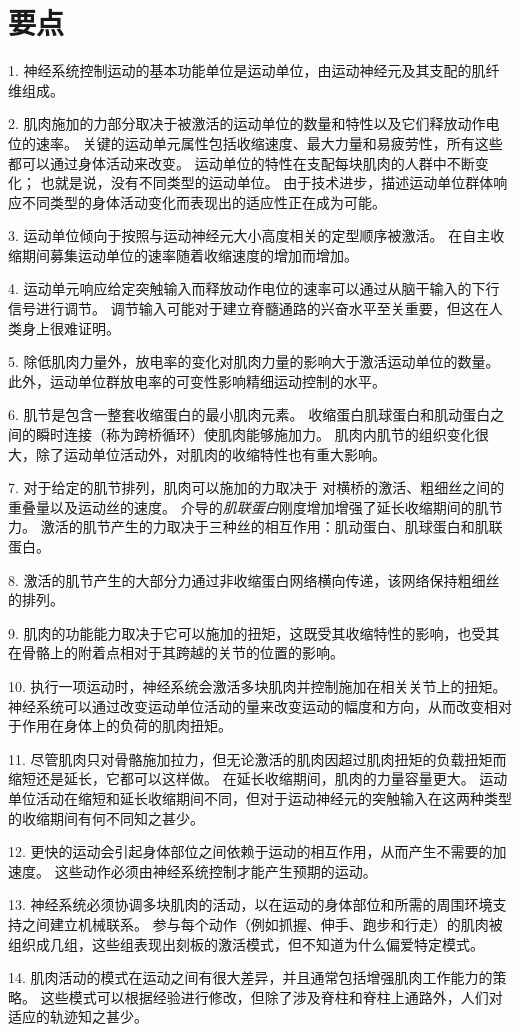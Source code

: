 \section{要点}

1. 神经系统控制运动的基本功能单位是运动单位，由运动神经元及其支配的肌纤维组成。 


2. 肌肉施加的力部分取决于被激活的运动单位的数量和特性以及它们释放动作电位的速率。
关键的运动单元属性包括收缩速度、最大力量和易疲劳性，所有这些都可以通过身体活动来改变。
运动单位的特性在支配每块肌肉的人群中不断变化；
也就是说，没有不同类型的运动单位。
由于技术进步，描述运动单位群体响应不同类型的身体活动变化而表现出的适应性正在成为可能。


3. 运动单位倾向于按照与运动神经元大小高度相关的定型顺序被激活。
在自主收缩期间募集运动单位的速率随着收缩速度的增加而增加。


4. 运动单元响应给定突触输入而释放动作电位的速率可以通过从脑干输入的下行信号进行调节。
调节输入可能对于建立脊髓通路的兴奋水平至关重要，但这在人类身上很难证明。


5. 除低肌肉力量外，放电率的变化对肌肉力量的影响大于激活运动单位的数量。
此外，运动单位群放电率的可变性影响精细运动控制的水平。


6. 肌节是包含一整套收缩蛋白的最小肌肉元素。
收缩蛋白肌球蛋白和肌动蛋白之间的瞬时连接（称为跨桥循环）使肌肉能够施加力。
肌肉内肌节的组织变化很大，除了运动单位活动外，对肌肉的收缩特性也有重大影响。


7. 对于给定的肌节排列，肌肉可以施加的力取决于  对横桥的激活、粗细丝之间的重叠量以及运动丝的速度。
 介导的\textit{肌联蛋白}刚度增加增强了延长收缩期间的肌节力。
激活的肌节产生的力取决于三种丝的相互作用：肌动蛋白、肌球蛋白和肌联蛋白。


8. 激活的肌节产生的大部分力通过非收缩蛋白网络横向传递，该网络保持粗细丝的排列。


9. 肌肉的功能能力取决于它可以施加的扭矩，这既受其收缩特性的影响，也受其在骨骼上的附着点相对于其跨越的关节的位置的影响。


10. 执行一项运动时，神经系统会激活多块肌肉并控制施加在相关关节上的扭矩。
神经系统可以通过改变运动单位活动的量来改变运动的幅度和方向，从而改变相对于作用在身体上的负荷的肌肉扭矩。


11. 尽管肌肉只对骨骼施加拉力，但无论激活的肌肉因超过肌肉扭矩的负载扭矩而缩短还是延长，它都可以这样做。
在延长收缩期间，肌肉的力量容量更大。
运动单位活动在缩短和延长收缩期间不同，但对于运动神经元的突触输入在这两种类型的收缩期间有何不同知之甚少。


12. 更快的运动会引起身体部位之间依赖于运动的相互作用，从而产生不需要的加速度。
这些动作必须由神经系统控制才能产生预期的运动。


13. 神经系统必须协调多块肌肉的活动，以在运动的身体部位和所需的周围环境支持之间建立机械联系。
参与每个动作（例如抓握、伸手、跑步和行走）的肌肉被组织成几组，这些组表现出刻板的激活模式，但不知道为什么偏爱特定模式。


14. 肌肉活动的模式在运动之间有很大差异，并且通常包括增强肌肉工作能力的策略。
这些模式可以根据经验进行修改，但除了涉及脊柱和脊柱上通路外，人们对适应的轨迹知之甚少。


